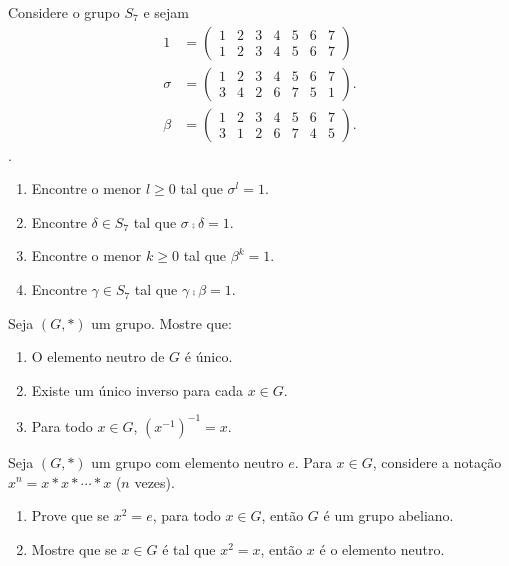 \documentclass[12pt]{exam}
\begin{document}
    \questao{} Considere o grupo $S_7$ e sejam
    \begin{align*}
        1 &= \begin{pmatrix}
            1 & 2 & 3 & 4 & 5 & 6 & 7\\
            1 & 2 & 3 & 4 & 5 & 6 & 7
        \end{pmatrix}\\
        \sigma &= \begin{pmatrix}
                1 & 2 & 3 & 4 & 5 & 6 & 7\\
                3 & 4 & 2 & 6 & 7 & 5 & 1
            \end{pmatrix}.\\
        \beta &= \begin{pmatrix}
                1 & 2 & 3 & 4 & 5 & 6 & 7\\
                3 & 1 & 2 & 6 & 7 & 4 & 5
            \end{pmatrix}.
    \end{align*}.
    \begin{enumerate}[label=({\alph*})]
        \item Encontre o menor $l \ge 0$ tal que $\sigma^l = 1$.

        \item Encontre $\delta \in S_7$ tal que $\sigma\comp\delta = 1$.

        \item Encontre o menor $k \ge 0$ tal que $\beta^k = 1$.

        \item Encontre $\gamma \in S_7$ tal que $\gamma\comp\beta = 1$.
    \end{enumerate}

    \vspace{.3cm}

    \questao{} Seja $(G,*)$ um grupo. Mostre que:
    \begin{enumerate}[label={\alph*})]
        \item O elemento neutro de $G$ {\'e} {\'u}nico.

        \item Existe um {\'u}nico inverso para cada $x \in G$.

        \item Para todo $x \in G$, $(x^{-1})^{-1} = x$.
    \end{enumerate}

    \vspace{.3cm}

    \questao{} Seja $(G,*)$ um grupo com elemento neutro $e$. Para $x\in
    G$, considere a nota{\c c}{\~a}o $x^n=x*x*\cdots *x$ ($n$ vezes).
    \begin{enumerate}[label=({\alph*})]
        \item Prove que se
        $x^2 = e$, para todo $x\in G$, ent{\~a}o $G$ {\'e} um grupo abeliano.

        \item Mostre que se $x\in G$ {\'e} tal que $x^2 = x$, ent{\~a}o $x$ {\'e} o elemento neutro.
    \end{enumerate}
\end{document}
